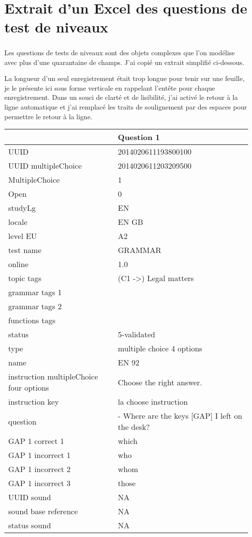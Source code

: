 \chapter{Extrait d'un Excel des questions de test de niveaux}
\label{ch:leveltest-sample}

\paragraph{}
Les questions de tests de niveaux sont des objets complexes que l'on modélise avec plus d'une quarantaine de champs.
J'ai copié un extrait simplifié ci-dessous.

La longueur d'un seul enregistrement était trop longue pour tenir sur une feuille, je le présente ici sous forme verticale en rappelant l'entête pour chaque enregistrement.
Dans un souci de clarté et de lisibilité, j'ai activé le retour à la ligne automatique et j'ai remplacé les traits de soulignement par des espaces pour permettre le retour à la ligne.

\begin{table}[ht]
\begin{tabular}{p{5cm}|p{8cm}}
 & Question 1 \\ \hline
UUID & 2014020611193800100 \\
UUID multipleChoice & 2014020611203209500 \\
MultipleChoice & 1 \\
Open & 0 \\
studyLg & EN \\
locale & EN GB \\
level EU & A2 \\
test name & GRAMMAR \\
online & 1.0 \\
topic tags & (C1 -\textgreater{}) Legal matters \\
grammar tags 1 &  \\
grammar tags 2 &  \\
functions tags &  \\
status & 5-validated \\
type & multiple choice 4 options \\
name & EN 92 \\
instruction multipleChoice four options & Choose the right answer. \\
instruction key & la choose instruction \\
question & - Where are the keys {[}GAP{]} I left on the desk? \\
GAP 1 correct 1 & which \\
GAP 1 incorrect 1 & who \\
GAP 1 incorrect 2 & whom \\
GAP 1 incorrect 3 & those \\
UUID sound & NA \\
sound base reference & NA \\
status sound & NA
\end{tabular}
\end{table}

